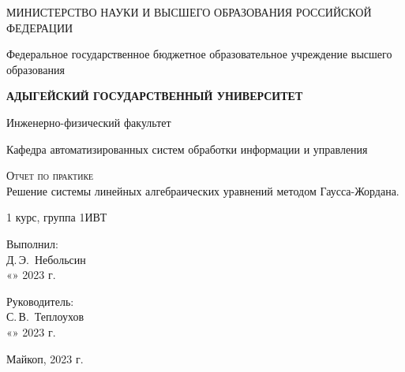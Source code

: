 \documentclass[12pt,a4paper]{scrartcl}
\begin{document}
  \begin{titlepage}
    \begin{center}
      \large
      МИНИСТЕРСТВО НАУКИ И ВЫСШЕГО ОБРАЗОВАНИЯ РОССИЙСКОЙ ФЕДЕРАЦИИ
      
      Федеральное государственное бюджетное образовательное учреждение высшего образования
      
      \textbf{АДЫГЕЙСКИЙ ГОСУДАРСТВЕННЫЙ УНИВЕРСИТЕТ}
      \vspace{0.25cm}
      
      Инженерно-физический факультет
      
      Кафедра автоматизированных систем обработки информации и управления
      \vfill

      \vfill
      
      \textsc{Отчет по практике}\\[5mm]
      
      {\LARGE Решение системы линейных алгебраических уравнений методом Гаусса-Жордана.}
      \bigskip
      
      1 курс, группа 1ИВТ
    \end{center}
    \vfill
    
    \newlength{\ML}
    \hfill\begin{minipage}{0.5\textwidth}
      Выполнил:\\
      \underline{\hspace{\ML}} Д.\,Э.~Небольсин\\
      «\underline{\hspace{0.7cm}}» \underline{\hspace{2cm}} 2023 г.
    \end{minipage}%
    \bigskip
    
    \hfill\begin{minipage}{0.5\textwidth}
      Руководитель:\\
      \underline{\hspace{\ML}} С.\,В.~Теплоухов\\
      «\underline{\hspace{0.7cm}}» \underline{\hspace{2cm}} 2023 г.
    \end{minipage}%
    \vfill
    
    \begin{center}
      Майкоп, 2023 г.
    \end{center}
  \end{titlepage}
\label{sec:intro}
\end{document}

